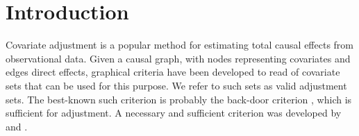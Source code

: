 \documentclass[11pt,a4paper]{article}
\theoremstyle{definition}
\theoremstyle{remark}
\begin{document}
\section{Introduction}

Covariate adjustment is a popular method for estimating total causal effects from observational data. Given a causal graph, with nodes representing covariates and edges direct effects,  graphical criteria have been developed to read of covariate sets that can be used for this purpose. We refer to such sets as valid adjustment sets. 
The best-known such criterion is probably the back-door criterion \citep{pearl1993bayesian}, which is sufficient for adjustment. A necessary and sufficient criterion was developed by \citet{shpitser2010validity} and \citet{perkovic16}. 


\end{document}
